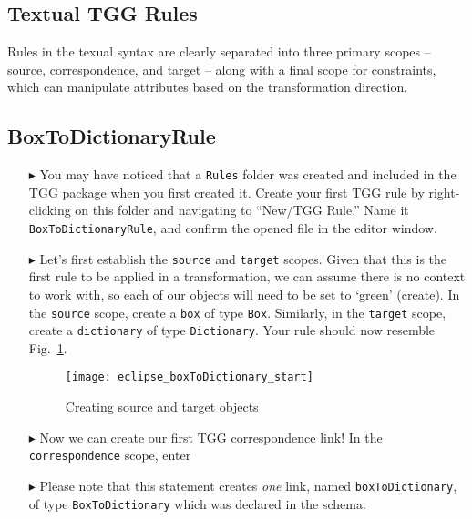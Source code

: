 \newpage
\hypertarget{rules tex}{}
\subsection{Textual TGG Rules}
\texHeader

Rules in the texual syntax are clearly separated into three primary scopes -- source, correspondence, and target -- along with a final scope for constraints,
which can manipulate attributes based on the transformation direction.

\subsection{BoxToDictionaryRule}

\begin{itemize}

\item[$\blacktriangleright$] You may have noticed that a \texttt{Rules} folder was created and included in the TGG package when you first created it. Create
your first TGG rule by right-clicking on this folder and navigating to ``New/TGG Rule.'' Name it \texttt{BoxToDictionaryRule}, and confirm the opened file
in the editor window.

\item[$\blacktriangleright$] Let's first establish the \texttt{source} and \texttt{target} scopes. Given that this is the first rule to be applied in a
transformation, we can assume there is no context to work with, so each of our objects will need to be set to `green' (create). In the \texttt{source} scope,
create a \texttt{box} of type \texttt{Box}. Similarly, in the \texttt{target} scope, create a \texttt{dictionary} of type \texttt{Dictionary}. Your rule
should now resemble Fig.~\ref{eclipse:textSourceRule}.

\vspace{0.5cm}

\begin{figure}[htbp]
\begin{center}
  \texttt{[image: eclipse\_boxToDictionary\_start]}
  \caption{Creating source and target objects}
  \label{eclipse:textSourceRule}
\end{center}
\end{figure}

\item[$\blacktriangleright$] Now we can create our first TGG correspondence link! In the \texttt{corr\-es\-pond\-ence} scope, enter 


\item[$\blacktriangleright$] Please note that this statement creates \emph{one} link, named \texttt{box\-To\-Dict\-ion\-ary}, of type
\texttt{Box\-To\-Dict\-ion\-ary} which was declared in the schema.

\end{itemize}

